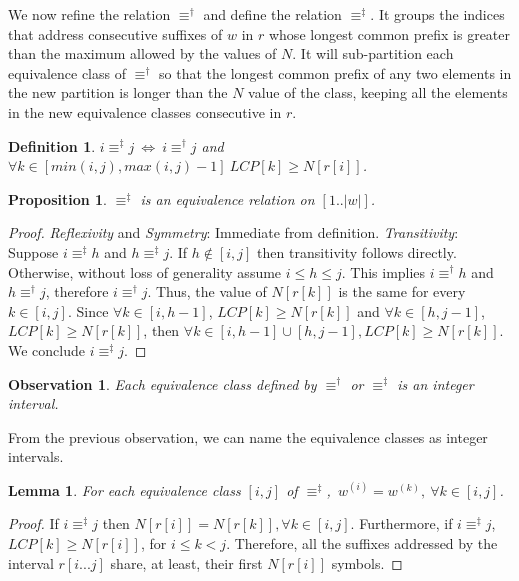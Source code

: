 \documentclass[submission]{dmtcs}
\newcommand\+[1]{\mathcal{#1}}
\newtheorem{observation}[theorem]{Observation}
\newtheorem{definition}[theorem]{Definition}
\newtheorem{lemma}[theorem]{Lemma}
\newtheorem{proposition}[theorem]{Proposition}
\begin{document}
We now refine the relation $\equiv^\dag$ and define
the relation $\equiv^\ddag$. It groups the indices that 
address consecutive suffixes of $w$ in $r$ 
whose longest common prefix is greater than the maximum 
allowed by the values of $N$. It will sub-partition each 
equivalence class of $\equiv^\dag$ so that the longest common prefix of any 
two elements in the new partition is longer
than the $N$ value of the class, keeping all the elements
in the new equivalence classes consecutive in $r$.

\begin{definition}\label{def:equivddag}
$i \equiv^\ddag j\  \Leftrightarrow  \ i\equiv^\dag j$  and
                   $\forall k \in [min(i,j), max(i,j)-1] \ LCP[k] \geq N[r[i]]$.
\end{definition}

\begin{proposition}
$\equiv^\ddag$ is an equivalence relation on $[1..|w|]$.
\end{proposition}

\begin{proof}
{\em Reflexivity} and {\em Symmetry}: Immediate from definition. 
{\em Transitivity}:
Suppose $i \equiv^\ddag h$ and $h \equiv^\ddag j$.
If $h \not\in [i,j]$ then transitivity follows directly. Otherwise,
without loss of generality assume $i\leq h\leq j$.
This implies  $i \equiv^\dag h$ and $h \equiv^\dag j$, 
therefore $i \equiv^\dag j$. 
Thus, the value of $N[r[k]]$ is the same for 
every $k \in [i,j]$.
Since $\forall k \in [i, h-1]$, $LCP[k] \geq N[r[k]]$
and   $\forall k \in [h, j-1]$, $LCP[k] \geq N[r[k]]$,
then $\forall k \in [i,h-1] \cup [h,j-1], LCP[k] \geq N[r[k]]$. 
We conclude $i\equiv^\ddag j$.
\end{proof}

\begin{observation}\label{obs:intervals}
Each equivalence class defined by $\equiv^\dag$ or $\equiv^\ddag$ is an
integer interval.
\end{observation}

From the previous observation, we can name the equivalence classes as integer
intervals.

\begin{lemma} \label{lemma:class_string}
For each equivalence class $[i,j]$ of $\equiv^\ddag$,\ 
$w^{(i)} = w^{(k)}, \ \forall k \in [i,j]$.
\end{lemma}
\begin{proof}
If $i\equiv^\ddag j$ then $N[r[i]] = N[r[k]], \forall k \in [i,j]$.
Furthermore, if $i \equiv^\ddag j$, $LCP[k] \ge N[r[i]]$, 
for $i \le k < j$. Therefore, all the suffixes addressed 
by the interval $r[i...j]$ share, at least, their first
$N[r[i]]$ symbols.
\end{proof}
\end{document}
